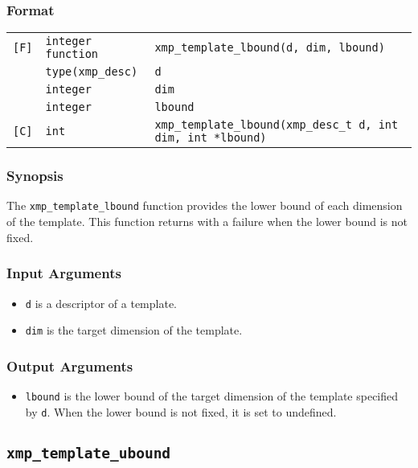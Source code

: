 \subsubsection*{Format}

\begin{tabular}{lll}

\verb![F]!& {\tt integer function}& {\tt xmp\_template\_lbound(d, dim, lbound)}\\
          & {\tt type(xmp\_desc)} & {\tt d}\\
          & {\tt integer} & {\tt dim}\\
          & {\tt integer} & {\tt lbound}\\

\verb![C]!&  {\tt int}& {\tt xmp\_template\_lbound(xmp\_desc\_t d, int dim, int *lbound)}\\

\end{tabular}

\subsubsection*{Synopsis}

The {\tt xmp\_template\_lbound} function provides the lower bound of each
dimension of the template. This function returns with a failure when the
lower bound is not fixed.

\subsubsection*{Input Arguments}
\begin{itemize}
 \item {\tt d} is a descriptor of a template.
 \item {\tt dim} is the target dimension of the template.
\end{itemize}

\subsubsection*{Output Arguments}
\begin{itemize}
 \item {\tt lbound} is the lower bound of the target dimension of the
       template specified by {\tt d}. When the lower bound is not
       fixed, it is set to undefined.
\end{itemize}


\subsection{\tt xmp\_template\_ubound}

